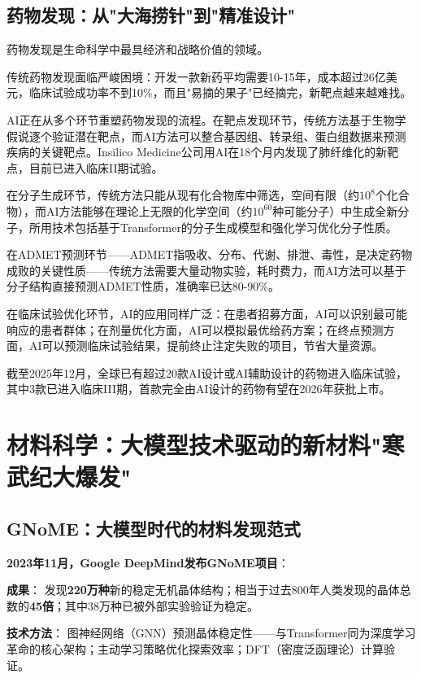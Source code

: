 \subsection{药物发现：从"大海捞针"到"精准设计"}

药物发现是生命科学中最具经济和战略价值的领域。

传统药物发现面临严峻困境：开发一款新药平均需要10-15年，成本超过26亿美元，临床试验成功率不到10\%，而且"易摘的果子"已经摘完，新靶点越来越难找。

AI正在从多个环节重塑药物发现的流程。在靶点发现环节，传统方法基于生物学假说逐个验证潜在靶点，而AI方法可以整合基因组、转录组、蛋白组数据来预测疾病的关键靶点。Insilico Medicine公司用AI在18个月内发现了肺纤维化的新靶点，目前已进入临床II期试验。

在分子生成环节，传统方法只能从现有化合物库中筛选，空间有限（约$10^8$个化合物），而AI方法能够在理论上无限的化学空间（约$10^{60}$种可能分子）中生成全新分子，所用技术包括基于Transformer的分子生成模型和强化学习优化分子性质。

在ADMET预测环节——ADMET指吸收、分布、代谢、排泄、毒性，是决定药物成败的关键性质——传统方法需要大量动物实验，耗时费力，而AI方法可以基于分子结构直接预测ADMET性质，准确率已达80-90\%。

在临床试验优化环节，AI的应用同样广泛：在患者招募方面，AI可以识别最可能响应的患者群体；在剂量优化方面，AI可以模拟最优给药方案；在终点预测方面，AI可以预测临床试验结果，提前终止注定失败的项目，节省大量资源。

截至2025年12月，全球已有超过20款AI设计或AI辅助设计的药物进入临床试验，其中3款已进入临床III期，首款完全由AI设计的药物有望在2026年获批上市。

\section{材料科学：大模型技术驱动的新材料"寒武纪大爆发"}

\subsection{GNoME：大模型时代的材料发现范式}

\textbf{2023年11月，Google DeepMind发布GNoME项目}\cite{merchant2023scaling}：

\textbf{成果}：
发现\textbf{220万种}新的稳定无机晶体结构；相当于过去800年人类发现的晶体总数的\textbf{45倍}；其中38万种已被外部实验验证为稳定。

\textbf{技术方法}：
图神经网络（GNN）预测晶体稳定性——与Transformer同为深度学习革命的核心架构；主动学习策略优化探索效率；DFT（密度泛函理论）计算验证。

